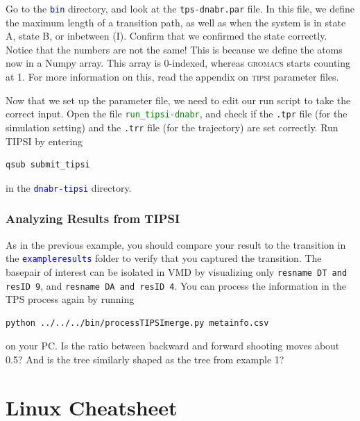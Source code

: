 \documentclass[]{article}
\begin{document}
Go to the \textcolor{blue}{\texttt{bin}} directory, and look at the \texttt{tps-dnabr.par} file. In this file, we define the maximum length of a transition path, as well as when the system is in state A, state B, or inbetween (I). Confirm that we confirmed the state correctly. Notice that the numbers are not the same! This is because we define the atoms now in a Numpy array. This array is 0-indexed, whereas \textsc{gromacs} starts counting at 1. For more information on this, read the appendix on \textsc{tipsi} parameter files.

Now that we set up the parameter file, we need to edit our run script to take the correct input. Open the file \textcolor{green}{\texttt{run\_tipsi-dnabr}}, and check if the \texttt{.tpr} file (for the simulation setting) and the \texttt{.trr} file (for the trajectory) are set correctly. Run \textsc{TIPSI} by entering
%
\begin{lstlisting}
qsub submit_tipsi
\end{lstlisting}
%
in the \textcolor{blue}{\texttt{dnabr-tipsi}} directory.

\subsubsection*{Analyzing Results from TIPSI}

As in the previous example, you should compare your result to the transition in the \textcolor{blue}{\texttt{exampleresults}} folder to verify that you captured the transition. The basepair of interest can be isolated in \textsc{VMD} by visualizing only \texttt{resname DT and resID 9}, and \texttt{resname DA and resID 4}. You can process the information in the TPS process again by running
%
\begin{lstlisting}
python ../../../bin/processTIPSImerge.py metainfo.csv
\end{lstlisting}
% 
on your PC. Is the ratio between backward and forward shooting moves about 0.5? And is the tree similarly shaped as the tree from example 1?

\newpage

\appendix
\section*{Linux Cheatsheet}
\setlength\parindent{0pt}
\end{document}
